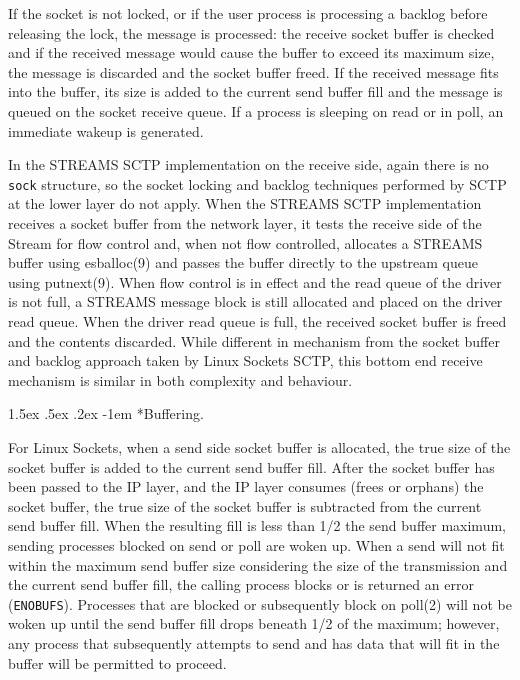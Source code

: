 \documentclass[letterpaper,final,notitlepage,twocolumn,10pt,twoside]{article}
\makeatletter
\renewcommand\paragraph{\@startsection{paragraph}{4}{\z@}%
                                    {1.5ex \@plus .5ex \@minus .2ex}%
                                    {-1em}%
                                    {\normalfont\normalsize\bfseries\slshape}}
\makeatother
\begin{document}
If the socket is not locked, or if the user process is processing a backlog
before releasing the lock, the message is processed: the receive socket buffer
is checked and if the received message would cause the buffer to exceed its
maximum size, the message is discarded and the socket buffer freed.  If the
received message fits into the buffer, its size is added to the current send
buffer fill and the message is queued on the socket receive queue.  If a
process is sleeping on read or in poll, an immediate wakeup is generated.

In the STREAMS SCTP implementation on the receive side, again there is no
\texttt{sock} structure, so the socket locking and backlog techniques
performed by SCTP at the lower layer do not apply.  When the STREAMS SCTP
implementation receives a socket buffer from the network layer, it tests the
receive side of the Stream for flow control and, when not flow controlled,
allocates a STREAMS buffer using esballoc(9) and passes the buffer directly to
the upstream queue using putnext(9).  When flow control is in effect and the
read queue of the driver is not full, a STREAMS message block is still
allocated and placed on the driver read queue.  When the driver read queue is
full, the received socket buffer is freed and the contents discarded.  While
different in mechanism from the socket buffer and backlog approach taken by
Linux Sockets SCTP, this bottom end receive mechanism is similar in both
complexity and behaviour.

\paragraph*{Buffering.}

For Linux Sockets, when a send side socket buffer is allocated, the true size of
the socket buffer is added to the current send buffer fill.  After the socket
buffer has been passed to the IP layer, and the IP layer consumes (frees or
orphans) the socket buffer, the true size of the socket buffer is subtracted
from the current send buffer fill.  When the resulting fill is less than 1/2
the send buffer maximum, sending processes blocked on send or poll are woken
up.  When a send will not fit within the maximum send buffer size considering
the size of the transmission and the current send buffer fill, the calling
process blocks or is returned an error (\texttt{ENOBUFS}).  Processes that are
blocked or subsequently block on poll(2) will not be woken up until the send
buffer fill drops beneath 1/2 of the maximum; however, any process that
subsequently attempts to send and has data that will fit in the buffer will be
permitted to proceed.
\end{document}
